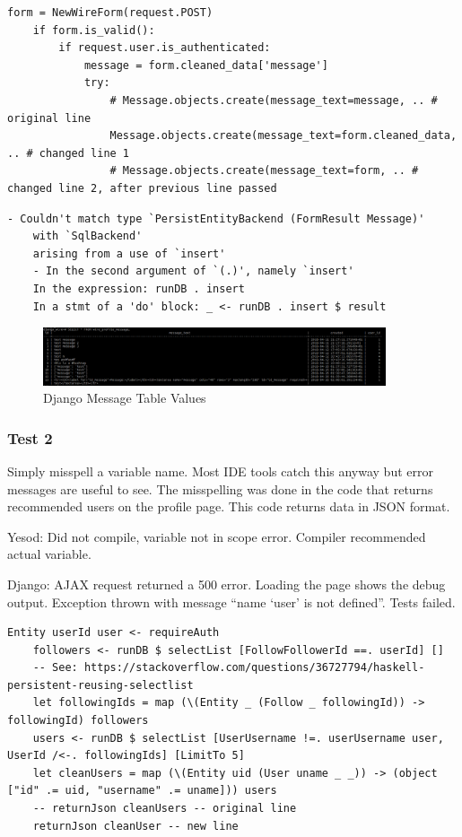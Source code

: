 \begin{lstlisting}[caption={Django Code Change},label={code:djangoTest1LC}]
	form = NewWireForm(request.POST)
	if form.is_valid():
		if request.user.is_authenticated:
			message = form.cleaned_data['message']
			try:
				# Message.objects.create(message_text=message, .. # original line
				Message.objects.create(message_text=form.cleaned_data, .. # changed line 1
				# Message.objects.create(message_text=form, .. # changed line 2, after previous line passed
\end{lstlisting}


\begin{lstlisting}[caption={Yesod Exception Message},label={code:yesodTest1Exception}]
	- Couldn't match type `PersistEntityBackend (FormResult Message)'
	with `SqlBackend'
	arising from a use of `insert'
	- In the second argument of `(.)', namely `insert'
	In the expression: runDB . insert
	In a stmt of a 'do' block: _ <- runDB . insert $ result
\end{lstlisting}

\begin{figure}[H]
	\centering
	\includegraphics[width=0.9\textwidth]{final_report/pics/djangoMessageDB.png}
	\caption{Django Message Table Values}
	\label{fig:djangoMessageDBTest1}
\end{figure}

\subsubsection{Test 2}
Simply misspell a variable name. Most IDE tools catch this anyway but
error messages are useful to see. The misspelling was done in the code
that returns recommended users on the profile page. This code returns
data in JSON format.

Yesod: Did not compile, variable not in scope error. Compiler recommended
actual variable.

Django: AJAX request returned  a 500 error. Loading the page shows the
debug output. Exception thrown with message ``name `user' is not defined''.
Tests failed.

\begin{lstlisting}[caption={Yesod Code Change},label={code:yesodTest2LC}]
	Entity userId user <- requireAuth
	followers <- runDB $ selectList [FollowFollowerId ==. userId] []
	-- See: https://stackoverflow.com/questions/36727794/haskell-persistent-reusing-selectlist
	let followingIds = map (\(Entity _ (Follow _ followingId)) -> followingId) followers
	users <- runDB $ selectList [UserUsername !=. userUsername user, UserId /<-. followingIds] [LimitTo 5]
	let cleanUsers = map (\(Entity uid (User uname _ _)) -> (object ["id" .= uid, "username" .= uname])) users
	-- returnJson cleanUsers -- original line
	returnJson cleanUser -- new line
\end{lstlisting}

